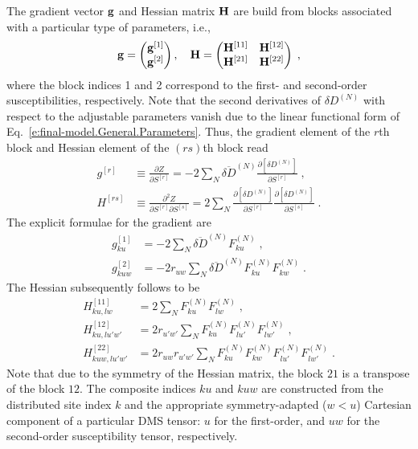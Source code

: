 \documentclass[aip,amsmath,amssymb,reprint,floatfix]{revtex4-1}
\begin{document}
The gradient vector ${\bf g}$ and Hessian matrix ${\bf H}$ 
are build from blocks associated with a particular type of parameters, i.e.,
%
\begin{equation}\label{e:Newton.gH}
 {\bf g} = 
\begin{pmatrix}
{\bf g}^{[1]} \\ 
{\bf g}^{[2]} 
\end{pmatrix} ,\quad
 {\bf H} = 
\begin{pmatrix}
{\bf H}^{[11]} & {\bf H}^{[12]}  \\ 
{\bf H}^{[21]} & {\bf H}^{[22]}  
\end{pmatrix} \;,
\end{equation}
%
where the block indices 1 and 2 correspond to the first\hyp{} and second\hyp{}order susceptibilities, respectively.
Note that the second derivatives of $\delta D^{(N)}$ 
with respect to the adjustable parameters vanish
due to the linear functional form of Eq.~\eqref{e:final-model.General.Parameters}.
Thus, the gradient element of the $r$th block and Hessian element of the $(rs)$th block read
%
\begin{subequations}
 \begin{align}
  g^{[r ]}    &\equiv \frac{\partial   Z}{\partial S^{[r]}} 
     =-2\sum_N \overline{\delta D}^{(N)}
               \frac{\partial   \left[ \delta D^{(N)} \right]}{\partial S^{[r]}} \;,\\
  H^{[rs]} &\equiv \frac{\partial^2 Z}{\partial S^{[r]} \partial S^{[s]}}  
     = 2\sum_N 
        \frac{\partial   \left[ \delta D^{(N)} \right]}{\partial S^{[r]}}
        \frac{\partial   \left[ \delta D^{(N)} \right]}{\partial S^{[s]}} \;.
 \end{align}
\end{subequations}
%
The explicit formulae for the gradient are
%
\begin{subequations}
 \begin{align}
  g^{[1]}_{ku} &=-2\sum_N \overline{\delta D}^{(N)} F^{(N)}_{ku} \;,\\
  g^{[2]}_{kuw} &=-2r_{uw} \sum_N \overline{\delta D}^{(N)} F^{(N)}_{ku} F^{(N)}_{kw} \;.
 \end{align}
\end{subequations}
%
The Hessian subsequently follows to be
%
\begin{subequations}
 \begin{align}
  H^{[11]}_{ku,lw} &= 2\sum_N F^{(N)}_{ku} F^{(N)}_{lw} \;,\\
  H^{[12]}_{ku,lu'w'} &= 2r_{u'w'} \sum_N F^{(N)}_{ku} F^{(N)}_{lu'} F^{(N)}_{lw'}  \;,\\
  H^{[22]}_{kuw,lu'w'} &= 2r_{uw} r_{u'w'} \sum_N F^{(N)}_{ku} F^{(N)}_{kw} F^{(N)}_{lu'} F^{(N)}_{lw'} \;.
 \end{align}
\end{subequations}
%
Note that due to the symmetry of the Hessian matrix, the block $21$
is a transpose of the block $12$. 
The composite indices $ku$ and $kuw$ are constructed from the distributed site index $k$
and the appropriate symmetry\hyp{}adapted ($w<u$) Cartesian component 
of a particular DMS tensor: $u$ for the first\hyp{}order,
and $uw$ for the second\hyp{}order susceptibility tensor, respectively.


\end{document}
